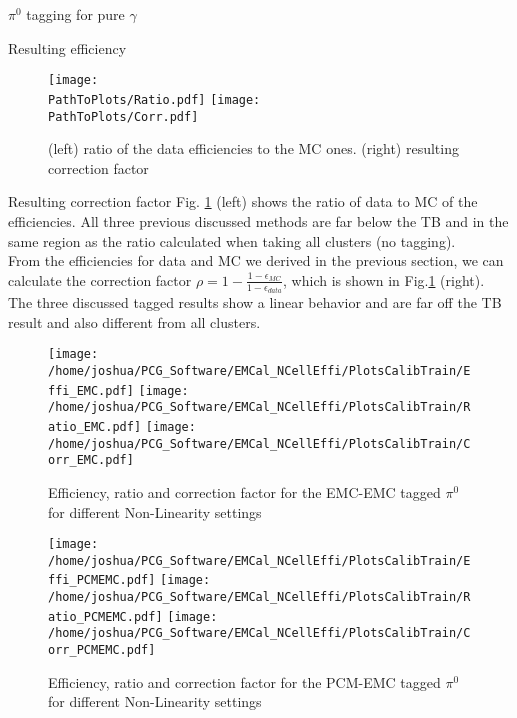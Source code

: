 \documentclass[ALICE]{ALICE_analysis_notes}
\newcommand{\PZ}{$\pi^0$\xspace}
\newcommand{\PathToPlots}{/home/joshua/PCG_Software/EMCal_NCellEffi/13TeVNomB_Wide/Pi0Tagging_13TeV_nom_04_26_WithTRD_WithBorderCells_1cellFT/pdf}
\begin{document}
\begin{section}{$\pi^{0}$ tagging for pure $\gamma$}
\begin{subsection}{Resulting efficiency}
	
	\begin{figure}[h!]
		\centering
		\texttt{[image: \\PathToPlots/Ratio.pdf]}	
		\texttt{[image: \\PathToPlots/Corr.pdf]}	
		\caption{ (left) ratio of the data efficiencies to the MC ones. (right) resulting correction factor}
		\label{fig:NCellEff_Tagging_Corr}
		
	\end{figure}
	
	\end{subsection}

	\begin{subsection}{Resulting correction factor}
		Fig. \ref{fig:NCellEff_Tagging_Corr} (left) shows the ratio of data to MC of the efficiencies. All three previous discussed methods are far below the TB and in the same region as the ratio calculated when taking all clusters (no tagging).\\
		From the efficiencies for data and MC we derived in the previous section, we can calculate the correction factor $\rho = 1 - \frac{1- \epsilon_{MC}}{1- \epsilon_{data}}$, which is shown in Fig.\ref{fig:NCellEff_Tagging_Corr} (right). The three discussed tagged results show a linear behavior and are far off the TB result and also different from all clusters. 
		
	\end{subsection}


\begin{figure}[h!]
	\centering
	\texttt{[image: /home/joshua/PCG\_Software/EMCal\_NCellEffi/PlotsCalibTrain/Effi\_EMC.pdf]}	
	\texttt{[image: /home/joshua/PCG\_Software/EMCal\_NCellEffi/PlotsCalibTrain/Ratio\_EMC.pdf]}	
	\texttt{[image: /home/joshua/PCG\_Software/EMCal\_NCellEffi/PlotsCalibTrain/Corr\_EMC.pdf]}
	\caption{ Efficiency, ratio and correction factor for the EMC-EMC tagged \PZ for different Non-Linearity settings}
	\label{fig:NCellEff_Train}
	
\end{figure}


\begin{figure}[h!]
	\centering
	\texttt{[image: /home/joshua/PCG\_Software/EMCal\_NCellEffi/PlotsCalibTrain/Effi\_PCMEMC.pdf]}	
	\texttt{[image: /home/joshua/PCG\_Software/EMCal\_NCellEffi/PlotsCalibTrain/Ratio\_PCMEMC.pdf]}	
	\texttt{[image: /home/joshua/PCG\_Software/EMCal\_NCellEffi/PlotsCalibTrain/Corr\_PCMEMC.pdf]}
	\caption{ Efficiency, ratio and correction factor for the PCM-EMC tagged \PZ for different Non-Linearity settings}
	\label{fig:NCellEff_Train_PCMEMC}
	

\end{figure}
\end{section}
\end{document}
